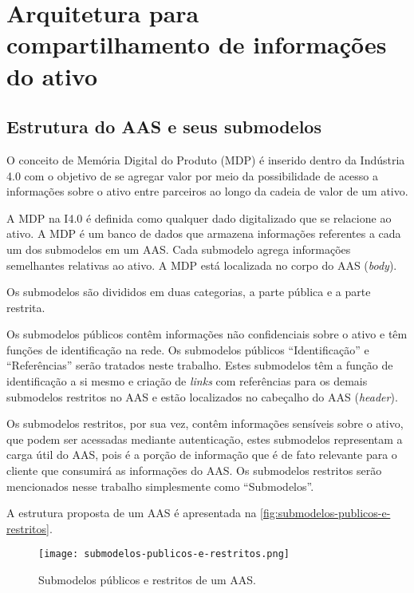 \chapter{Arquitetura para compartilhamento de informações do ativo}


\section{Estrutura do AAS e seus submodelos}

	O conceito de Memória Digital do Produto (MDP) é inserido dentro da Indústria 4.0 com o objetivo de se agregar valor por meio da possibilidade de acesso a informações sobre o ativo entre parceiros ao longo da cadeia de valor de um ativo.
	
	A MDP na I4.0 é definida como qualquer dado digitalizado que se relacione ao ativo. A MDP é um banco de dados que armazena informações referentes a cada um dos submodelos em um AAS. Cada submodelo agrega informações semelhantes relativas ao ativo. A MDP está localizada no corpo do AAS (\textit{body}).
	
	Os submodelos são divididos em duas categorias, a parte pública e a parte restrita.
	
	Os submodelos públicos contêm informações não confidenciais sobre o ativo e têm funções de identificação na rede. Os submodelos públicos ``Identificação'' e ``Referências'' serão tratados neste trabalho. Estes submodelos têm a função de identificação a si mesmo e criação de \textit{links} com referências para os demais submodelos restritos no AAS e estão localizados no cabeçalho do AAS (\textit{header}).
	
	Os submodelos restritos, por sua vez, contêm informações sensíveis sobre o ativo, que podem ser acessadas mediante autenticação, estes submodelos representam a carga útil do AAS, pois é a porção de informação que é de fato relevante para o cliente que consumirá as informações do AAS. Os submodelos restritos serão mencionados nesse trabalho simplesmente como ``Submodelos''.
	
	A estrutura proposta de um AAS é apresentada na \autoref{fig:submodelos-publicos-e-restritos}.
	
	\begin{figure}[htb]
		\centering
		\caption{Submodelos públicos e restritos de um AAS.}
		\label{fig:submodelos-publicos-e-restritos}
		\texttt{[image: submodelos-publicos-e-restritos.png]}
	\end{figure}

